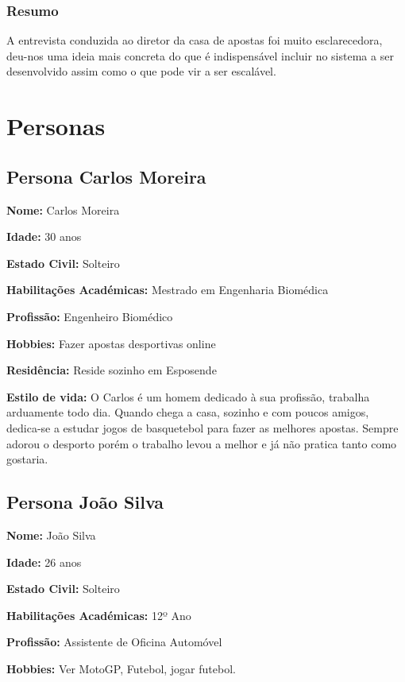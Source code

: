 \subsubsection{Resumo} A entrevista conduzida ao diretor da casa de apostas foi muito esclarecedora, deu-nos uma ideia mais concreta do que é indispensável incluir no sistema a ser desenvolvido assim como o que pode vir a ser escalável.

\section{Personas}

\subsection{Persona Carlos Moreira} 

\textbf{Nome: }Carlos Moreira 

\textbf{Idade: }30 anos

\textbf{Estado Civil: }Solteiro

\textbf{Habilitações Académicas: }Mestrado em Engenharia Biomédica

\textbf{Profissão: }Engenheiro Biomédico

\textbf{Hobbies: }Fazer apostas desportivas online

\textbf{Residência: }Reside sozinho em Esposende\vspace{5mm}

\textbf{Estilo de vida: } O Carlos é um homem dedicado à sua profissão, trabalha arduamente todo dia. Quando chega a casa, sozinho e com poucos amigos, dedica-se a estudar jogos de basquetebol para fazer as melhores apostas. Sempre adorou o desporto porém o trabalho levou a melhor e já não pratica tanto como gostaria. 


\subsection{Persona João Silva} 

\textbf{Nome: } João Silva

\textbf{Idade: }26 anos

\textbf{Estado Civil: }Solteiro

\textbf{Habilitações Académicas: } 12º Ano

\textbf{Profissão: } Assistente de Oficina Automóvel

\textbf{Hobbies: } Ver MotoGP, Futebol, jogar futebol.

